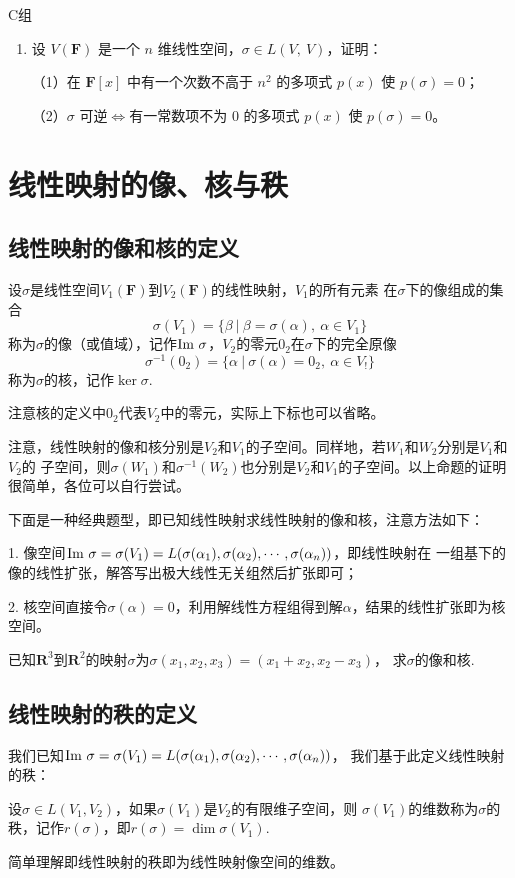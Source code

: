 \centerline{\heiti C组}
\begin{enumerate}
	\item 设 $V(\mathbf{F})$ 是一个 $n$ 维线性空间，$\sigma \in L(V,\ V)$，证明：

	（1）在 $\mathbf{F}[x]$ 中有一个次数不高于 $n^2$ 的多项式 $p(x)$ 使 $p(\sigma)=0$；
	
	（2）$\sigma$ 可逆$\iff$有一常数项不为 $0$ 的多项式 $p(x)$ 使 $p(\sigma)=0$。
\end{enumerate}

\section{线性映射的像、核与秩}
\subsection{线性映射的像和核的定义}
\begin{definition}
	设$\sigma$是线性空间$V_1(\mathbf{F})$到$V_2(\mathbf{F})$的线性映射，$V_1$的所有元素
	在$\sigma$下的像组成的集合
	$$\sigma(V_1)=\{\beta\ |\ \beta=\sigma(\alpha),\ \alpha \in V_1\}$$
	称为$\sigma$的像（或值域），记作$\textup{Im }\sigma$，$V_2$的零元$0_2$在$\sigma$下的完全原像
	$$\sigma^{-1}(0_2)=\{\alpha\ |\ \sigma(\alpha)=0_2,\ \alpha \in V_!\}$$
	称为$\sigma$的核，记作$\ker \sigma$.
\end{definition}
注意核的定义中$0_2$代表$V_2$中的零元，实际上下标也可以省略。

注意，线性映射的像和核分别是$V_2$和$V_1$的子空间。同样地，若$W_1$和$W_2$分别是$V_1$和$V_2$的
子空间，则$\sigma(W_1)$和$\sigma^{-1}(W_2)$也分别是$V_2$和$V_1$的子空间。以上命题的证明很简单，各位可以自行尝试。

下面是一种经典题型，即已知线性映射求线性映射的像和核，注意方法如下：

1. 像空间$\textup{Im }\sigma=\sigma(V_1)=L(\sigma(\alpha_1),\sigma(\alpha_2),\cdots,\sigma(\alpha_n))$，即线性映射在
一组基下的像的线性扩张，解答写出极大线性无关组然后扩张即可；

2. 核空间直接令$\sigma(\alpha)=0$，利用解线性方程组得到解$\alpha$，结果的线性扩张即为核空间。
\begin{example}
	已知$\mathbf{R}^3$到$\mathbf{R}^2$的映射$\sigma$为$\sigma(x_1,x_2,x_3)=(x_1+x_2,x_2-x_3)$，
	求$\sigma$的像和核.
\end{example}
\subsection{线性映射的秩的定义}
我们已知$\textup{Im }\sigma=\sigma(V_1)=L(\sigma(\alpha_1),\sigma(\alpha_2),\cdots,\sigma(\alpha_n))$，
我们基于此定义线性映射的秩：
\begin{definition}
	设$\sigma\in L(V_1,V_2)$，如果$\sigma(V_1)$是$V_2$的有限维子空间，则
	$\sigma(V_1)$的维数称为$\sigma$的秩，记作$r(\sigma)$，即$r(\sigma)=\dim \sigma(V_1)$.
\end{definition}
简单理解即线性映射的秩即为线性映射像空间的维数。
